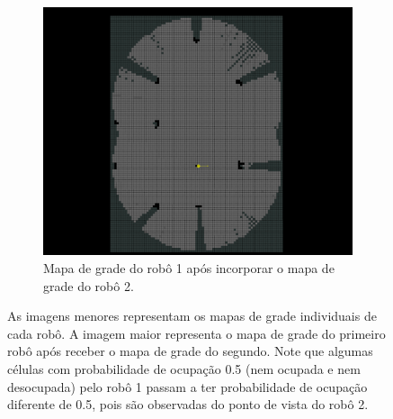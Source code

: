 \begin{figure}[]
\begin{subfigure}{0.45\textwidth}
  \end{subfigure}
  \begin{subfigure}{0.65\textwidth}
    \includegraphics[width=\textwidth]{figs/map-merge.png}
    \caption{Mapa de grade do robô 1 após incorporar o mapa de grade 
      do robô 2. }
  \end{subfigure}
  \caption[Fusão de mapas de grade de ocupação]{As imagens menores representam os mapas de grade 
  individuais de cada robô. A imagem maior representa o mapa de grade do
  primeiro robô após receber o mapa de grade do segundo. Note que algumas
  células com probabilidade de ocupação 0.5 (nem ocupada e nem desocupada) pelo robô 1 passam a ter probabilidade de ocupação diferente de 0.5, pois são observadas do ponto de vista do robô 2.}
  \label{fig:grid-map-exchange}
\end{figure}
